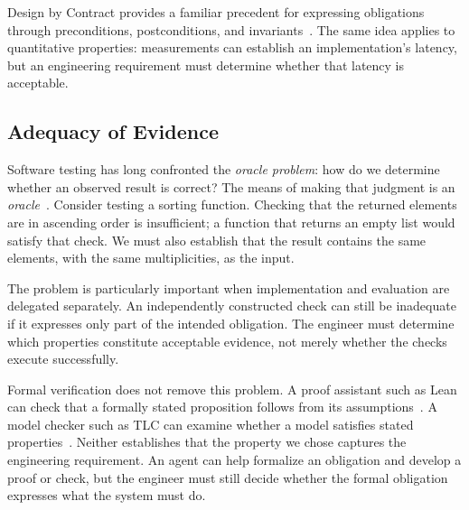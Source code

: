 Design by Contract provides a familiar precedent for expressing obligations through preconditions, postconditions, and invariants~\citep{meyer1997oosc}. The same idea applies to quantitative properties: measurements can establish an implementation's latency, but an engineering requirement must determine whether that latency is acceptable.

\subsection{Adequacy of Evidence}\label{heading:adequacy-of-evidence}


Software testing has long confronted the \emph{oracle problem}: how do we determine whether an observed result is correct? The means of making that judgment is an \emph{oracle}~\citep{barr2015oracle}. Consider testing a sorting function. Checking that the returned elements are in ascending order is insufficient; a function that returns an empty list would satisfy that check. We must also establish that the result contains the same elements, with the same multiplicities, as the input.

The problem is particularly important when implementation and evaluation are delegated separately. An independently constructed check can still be inadequate if it expresses only part of the intended obligation. The engineer must determine which properties constitute acceptable evidence, not merely whether the checks execute successfully.



Formal verification does not remove this problem. A proof assistant such as Lean can check that a formally stated proposition follows from its assumptions~\citep{lean-reference}. A model checker such as TLC can examine whether a model satisfies stated properties~\citep{lamport2002}. Neither establishes that the property we chose captures the engineering requirement. An agent can help formalize an obligation and develop a proof or check, but the engineer must still decide whether the formal obligation expresses what the system must do.

